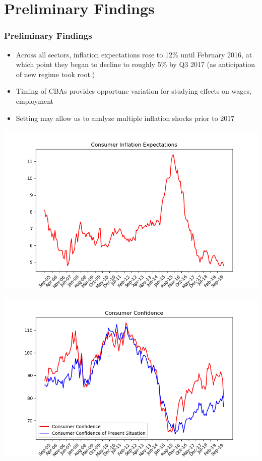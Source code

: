 \documentclass{beamer}
\begin{document}
\section{Preliminary Findings}
\begin{frame}
\frametitle{Preliminary Findings}
	\begin{itemize}
	\item Across all sectors, inflation expectations rose to 12\% until February 2016, at which point they began to decline to roughly 5\% by Q3 2017 (as anticipation of new regime took root.)
	\item Timing of CBAs provides opportune variation for studying effects on wages, employment
	\item Setting may allow us to analyze multiple inflation shocks prior to 2017
	\end{itemize}
\end{frame} 
\begin{frame}
		\centering
		\includegraphics[scale=.6]{old_figures/IBRE_Consumer_Inflation_Expectations.png}
\end{frame}


\begin{frame}
		\centering
		\includegraphics[scale=.6]{old_figures/IBRE_Consumer_Expectations}
\end{frame}
\end{document}

